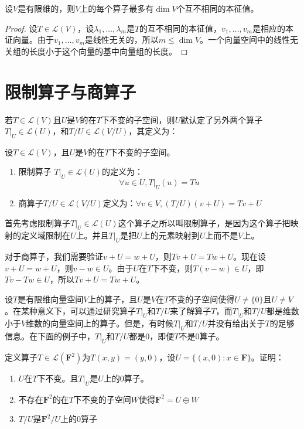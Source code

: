 \documentclass[10pt,a4paper,UTF8]{article}
\begin{document}
\begin{theorem}
设\(V\)是有限维的，则\(V\)上的每个算子最多有\(\dim V\)个互不相同的本征值。
\end{theorem}

\begin{proof}
设\(T\in \mathcal{L}(V)\)，设\(\lambda_{1},\ldots ,\lambda_{m}\)是\(T\)的互不相同的本征值，\(v_{1},\ldots ,v_{m}\)是相应的本证向量。由于\(v_{1},\ldots ,v_{m}\)是线性无关的，所以\(m \leq \dim V\)。一个向量空间中的线性无关组的长度小于这个向量的基中向量组的长度。
\end{proof}
\section{限制算子与商算子}
\label{sec:org2fee96f}


若\(T\in \mathcal{L}(V)\)且\(U\)是\(V\)的在\(T\)下不变的子空间，则\(U\)默认定了另外两个算子\(T|_{U} \in \mathcal{L}(U)\)，和\(T/U \in \mathcal{L}(V/U)\)，其定义为：
\begin{definition}
设\(T\in \mathcal{L}(V)\)，且\(U\)是\(V\)的在\(T\)下不变的子空间。
\begin{enumerate}
\item 限制算子 \(T|_{U} \in \mathcal{L}(U)\)的定义为：\[\forall u\in U, T|_{U}(u) = Tu\]
\item 商算子\(T/U \in \mathcal{L}(V/U)\)定义为：\(\forall v\in V, (T/U)(v+U) = Tv + U\)
\end{enumerate}
\end{definition}

首先考虑限制算子\(T|_{U}\in \mathcal{L}(U)\)这个算子之所以叫限制算子，是因为这个算子把映射的定义域限制在\(U\)上。并且\(T|_{U}\)是把\(U\)上的元素映射到\(U\)上而不是\(V\)上。

对于商算子，我们需要验证\(v+U = w +U\)，则\(Tv + U = Tw + U\)。现在设\(v+U = w+U\)，则\(v-w \in U\)。由于\(U\)在\(T\)下不变，则\(T(v-w)\in U\)，即\(Tv - Tw\in U\)，所以\(Tv + U = Tw + U\)。

设\(T\)是有限维向量空间\(V\)上的算子，且\(U\)是\(V\)在\(T\)不变的子空间使得\(U\neq \{0\}\)且\(U\neq V\)。在某种意义下，可以通过研究算子\(T|_{U}\)和\(T/U\)来了解算子\(T\)，而\(T|_{U}\)和\(T/U\)都是维数小于\(V\)维数的向量空间上的算子。但是，有时候\(T|_{U}\)和\(T/U\)并没有给出关于\(T\)的足够信息。在下面的例子中，\(T|_{U}\)和\(T/U\)都是\(0\)，即便\(T\)不是\(0\)算子。

\begin{instance}
定义算子\(T\in \mathcal{L}(\mathbf{F}^{2})\)为\(T(x,y) = (y,0)\)，设\(U=\{(x,0):x\in \mathbf{F}\}\)。证明：
\begin{enumerate}
\item \(U\)在\(T\)下不变。且\(T|_{U}\)是\(U\)上的\(0\)算子。
\item 不存在\(\mathbf{F}^{2}\)的在\(T\)下不变的子空间\(W\)使得\(\mathbf{F}^{2} = U\oplus W\)
\item \(T/U\)是\(\mathbf{F}^{2}/U\)上的\(0\)算子
\end{enumerate}
\end{instance}
\end{document}
